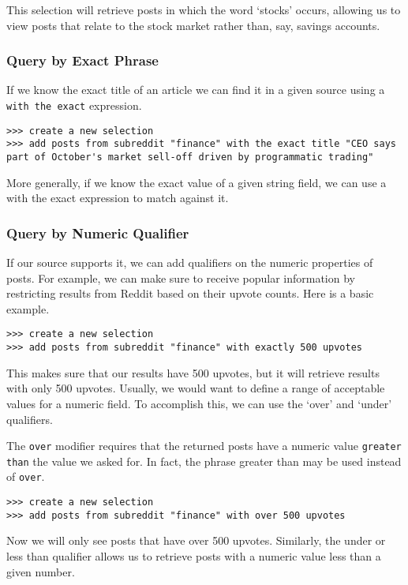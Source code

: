 This selection will retrieve posts in which the word ‘stocks’ occurs, allowing us to view posts that relate to the stock market rather than, say, savings accounts.


\subsubsection{Query by Exact Phrase}
If we know the exact title of an article we can find it in a given source using a \texttt{with the exact} expression.
\newline\begin{minipage}{\linewidth}\begin{lstlisting}
>>> create a new selection
>>> add posts from subreddit "finance" with the exact title "CEO says part of October's market sell-off driven by programmatic trading"
\end{lstlisting}\end{minipage}

More generally, if we know the exact value of a given string field, we can use a with the exact expression to match against it.



\subsubsection{Query by Numeric Qualifier}
If our source supports it, we can add qualifiers on the numeric properties of posts. For example, we can make sure to receive popular information by restricting results from Reddit based on their upvote counts. Here is a basic example.
\newline\begin{minipage}{\linewidth}\begin{lstlisting}
>>> create a new selection
>>> add posts from subreddit "finance" with exactly 500 upvotes
\end{lstlisting}\end{minipage}
This makes sure that our results have 500 upvotes, but it will retrieve results with only 500 upvotes. Usually, we would want to define a range of acceptable values for a numeric field. To accomplish this, we can use the ‘over’ and ‘under’ qualifiers.

The \texttt{over} modifier requires that the returned posts have a numeric value \texttt{greater than} the value we asked for. In fact, the phrase greater than may be used instead of \texttt{over}.
\newline\begin{minipage}{\linewidth}\begin{lstlisting}
>>> create a new selection
>>> add posts from subreddit "finance" with over 500 upvotes
\end{lstlisting}\end{minipage}
Now we will only see posts that have over 500 upvotes. Similarly, the under or less than qualifier allows us to retrieve posts with a numeric value less than a given number.

